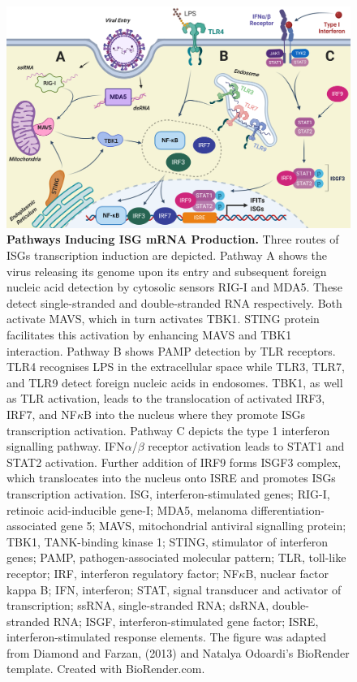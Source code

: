 \begin{figure}
    \centering
    \includegraphics[width=1\linewidth]{04. Introduction//Figs/01. IFIT transcription activation figure.png}
    \caption[Pathways Inducing ISG mRNA Production.]{\textbf{Pathways Inducing ISG mRNA Production.} Three routes of ISGs transcription induction are depicted. Pathway A shows the virus releasing its genome upon its entry and subsequent foreign nucleic acid detection by cytosolic sensors RIG-I and MDA5. These detect single-stranded and double-stranded RNA respectively. Both activate MAVS, which in turn activates TBK1. STING protein facilitates this activation by enhancing MAVS and TBK1 interaction. Pathway B shows PAMP detection by TLR receptors. TLR4 recognises LPS in the extracellular space while TLR3, TLR7, and TLR9 detect foreign nucleic acids in endosomes. TBK1, as well as TLR activation, leads to the translocation of activated IRF3, IRF7, and NF\(\kappa\)B into the nucleus where they promote ISGs transcription activation. Pathway C depicts the type 1 interferon signalling pathway. IFN\(\alpha\)/\(\beta\) receptor activation leads to STAT1 and STAT2 activation. Further addition of IRF9 forms ISGF3 complex, which translocates into the nucleus onto ISRE and promotes ISGs transcription activation. ISG, interferon-stimulated genes; RIG-I, retinoic acid-inducible gene-I; MDA5, melanoma differentiation-associated gene 5; MAVS, mitochondrial antiviral signalling protein; TBK1, TANK-binding kinase 1; STING, stimulator of interferon genes; PAMP, pathogen-associated molecular pattern; TLR, toll-like receptor; IRF, interferon regulatory factor; NF\(\kappa\)B, nuclear factor kappa B; IFN, interferon; STAT, signal transducer and activator of transcription; ssRNA, single-stranded RNA; dsRNA, double-stranded RNA; ISGF, interferon-stimulated gene factor; ISRE, interferon-stimulated response elements. The figure was adapted from Diamond and Farzan, (2013) \cite{Diamond2013TheProteins} and Natalya Odoardi's BioRender template. Created with BioRender.com.}
    \label{fig:Pathways Inducing ISG mRNA Production.}
\end{figure}

